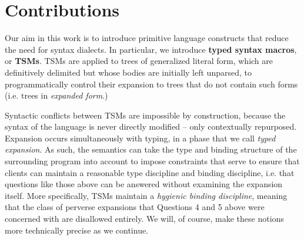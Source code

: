 





\section{Contributions}\label{sec:contributions}
Our aim in this work is to introduce primitive language constructs that reduce the need for syntax dialects. In particular, we 
introduce \textbf{typed syntax macros}, or \textbf{TSMs}. TSMs are applied to trees of {generalized literal form}, which are definitively delimited but whose bodies are initially left unparsed, to programmatically control their expansion to trees that do not contain such forms (i.e. trees in \emph{expanded form}.) 

Syntactic conflicts between TSMs are impossible by construction, because the syntax of the language is never directly modified -- only contextually repurposed. Expansion occurs simultaneously with typing, in a phase that we call \emph{typed expansion}. As such, the semantics can take the type and binding structure of the surrounding program into account to impose constraints that serve to ensure that clients can maintain a reasonable type discipline and binding discipline, i.e. that questions like those above can be answered without examining the expansion itself. More specifically, TSMs maintain a \emph{hygienic binding discipline}, meaning that the class of perverse expansions that Questions 4 and 5 above were concerned with are disallowed entirely. We will, of course, make these notions more technically precise as we continue.

